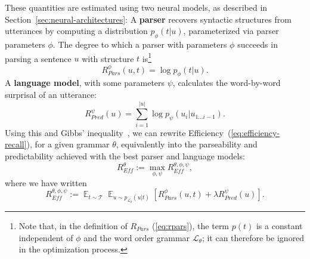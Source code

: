 \documentclass[10pt,twoside,lineno]{article}
\DeclareMathOperator*{\argmax}{arg\,max}
\DeclareMathOperator{\E}{\mathop{\mathbb{E}}}
\newcommand{\key}[1]{\textbf{#1}}
\newcommand{\utterance}{\mathcal{U}}
\newcommand{\tree}{\mathcal{T}}
\begin{document}
These quantities are estimated using two neural models, as described in Section~\ref{sec:neural-architectures}:
A \key{parser} recovers syntactic structures from utterances by computing a distribution $p_\phi(t|u)$, parameterized via parser parameters $\phi$.
The degree to which a parser with parameters $\phi$ succeeds in parsing a sentence $u$ with structure $t$ is\footnote{Note that, in the definition of $R_{Pars}$ (\ref{eq:rpars}), the term $p(t)$ is a constant independent of $\phi$ and the word order grammar $\mathcal{L}_\theta$; it can therefore be ignored in the optimization process.} 
\begin{equation}
	R_{Pars}^{\phi}(u,t) =  \log p_\phi(t|u).
\end{equation}
%
A \key{language model}, with some parameters $\psi$, calculates the word-by-word surprisal of an utterance:
\begin{equation}
	R_{Pred}^{\psi}(u) = \sum_{i=1}^{|u|} \log p_\psi(u_i|u_{1\dots i-1}).
\end{equation}
Using this and Gibbs' inequality~\cite{cover2006elements}, we can rewrite Efficiency~(\ref{eq:efficiency-recall}), for a given grammar $\theta$, equivalently into the parseability and predictability achieved with the best parser and language models:
\begin{equation}
	R_{\textit{Eff}}^{\theta} := \max_{\phi,\psi} R_{\textit{Eff}}^{\theta, \phi, \psi},
\end{equation}\label{eq:efficiency-rewrite}
where we have written
\begin{equation}
R_{\textit{Eff}}^{\theta, \phi, \psi} := \E_{t \sim \mathcal{T}} \E_{u \sim p_{\mathcal{L}_\theta}(u|t)} \left[R_{Pars}^{\phi}(u,t) + \lambda R_{Pred}^{\psi}(u)\right].
\end{equation}
%
\end{document}
